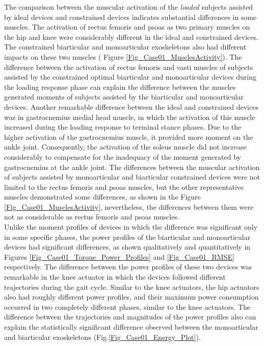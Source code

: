 \documentclass[10pt,letterpaper]{article}
\begin{document}
The comparison between the muscular activation of the {\it loaded} subjects assisted by ideal devices and constrained devices indicates substantial differences in some muscles. The activation of rectus femoris and psoas as two primary muscles on the hip and knee were considerably different in the ideal and constrained devices.  The constrained biarticular and monoarticular exoskeletons also had different impacts on these two muscles ( Figure \ref{Fig_Case01_MusclesActivity}). The difference between the activation of rectus femoris and vasti muscles of subjects assisted by the constrained optimal biarticular and monoarticular devices during the loading response phase can explain the difference between the muscles generated moments of subjects assisted by the biarticular and monoarticular devices. Another remarkable difference between the ideal and constrained devices was in gastrocnemius medial head muscle, in which the activation of this muscle increased during the loading response to terminal stance phases. Due to the higher activation of the gastrocnemius muscle, it provided more moment on the ankle joint. Consequently, the activation of the soleus muscle did not increase considerably to compensate for the inadequacy of the moment generated by gastrocnemius at the ankle joint.
The differences between the muscular activation of subjects assisted by monoarticular and biarticular constrained devices were not limited to the rectus femoris and psoas muscles, but the other representative muscles demonstrated some differences, as shown in the Figure \ref{Fig_Case01_MusclesActivity}, nevertheless, the differences between them were not as considerable as rectus femoris and psoas muscles.\\
Unlike the moment profiles of devices in which the difference was significant only in some specific phases, the power profiles of the biarticular and monoarticular devices had significant differences, as shown qualitatively and quantitatively in Figures \ref{Fig_Case01_Torque_Power_Profiles} and \ref{Fig_Case01_RMSE} respectively. The difference between the power profiles of these two devices was remarkable in the knee actuator in which the devices followed different trajectories during the gait cycle. Similar to the knee actuators, the hip actuators also had roughly different power profiles, and their maximum power consumption occurred in two completely different phases, similar to the knee actuators.  The difference between the trajectories and magnitudes of the power profiles also can explain the statistically significant difference observed between the monoarticular and biarticular exoskeletons (Fig.\ref{Fig_Case01_Energy_Plot}).\\
\end{document}

